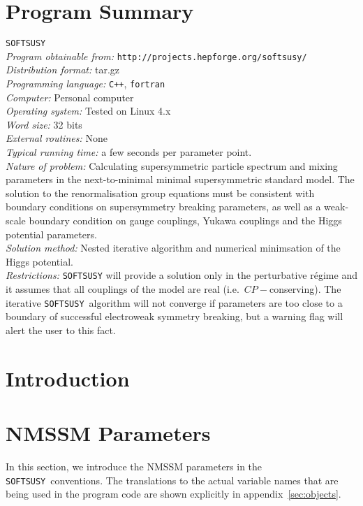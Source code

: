 \documentclass[final,3p,times,pdflatex]{elsarticle}
\def\SOFTSUSY{{\tt SOFTSUSY}}
\begin{document}
\section{Program Summary}
 \SOFTSUSY{}\\
{\em Program obtainable
  from:} {\tt http://projects.hepforge.org/softsusy/}\\
{\em Distribution format:}\/ tar.gz\\
{\em Programming language:} {\tt C++}, {\tt fortran}\\
{\em Computer:}\/ Personal computer\\
{\em Operating system:}\/ Tested on Linux 4.x\\
{\em Word size:}\/ 32 bits\\
{\em External routines:}\/ None\\
{\em Typical running time:}\/ a few seconds per parameter point.\\
{\em Nature of problem:}\/ Calculating supersymmetric particle spectrum and
mixing parameters in the next-to-minimal minimal supersymmetric standard
model. The solution to the renormalisation group equations must be consistent
with boundary conditions on supersymmetry breaking parameters, as
well as a weak-scale boundary condition on gauge 
couplings, Yukawa couplings and the Higgs potential parameters.\\
{\em Solution method:}\/ Nested iterative algorithm and numerical minimsation
of the Higgs potential. \\
{\em Restrictions:} {\SOFTSUSY} will provide a solution only in the
perturbative r\'{e}gime and it
assumes that all couplings of the model are real
(i.e.\ $CP-$conserving). The iterative \SOFTSUSY~algorithm will not 
converge if parameters are too close to a boundary of successful electroweak
symmetry breaking, but a warning flag will alert the user to this fact.

\newpage

\section{Introduction}

\section{NMSSM Parameters \label{sec:notation}}

In this section, we introduce the NMSSM parameters
in the \SOFTSUSY~conventions. The translations to the actual variable
names that are being used in the program code are shown explicitly in
appendix~\ref{sec:objects}. 
\end{document}
